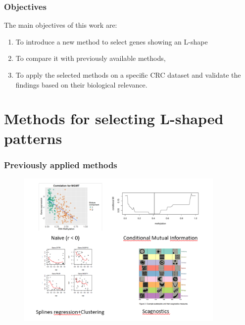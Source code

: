 \documentclass[handout]{beamer}
\begin{document}
\begin{frame}
	\frametitle{Objectives}
	
The main objectives of this work are:
\begin{enumerate}
	
	\item To introduce a new method to select genes showing an L-shape
	\item To compare it with previously available methods, 
	\item To apply the selected methods on a specific CRC dataset and validate the findings based on their biological relevance.
	
\end{enumerate}

\end{frame}

\section{Methods for selecting L-shaped patterns}

\begin{frame}
\frametitle{Previously applied methods}


\begin{center}
	\begin{figure}[h]          
		\includegraphics[width=0.9\textwidth]{images/otherMethods.png}
	\end{figure}
\end{center}


\end{frame}
\end{document}

